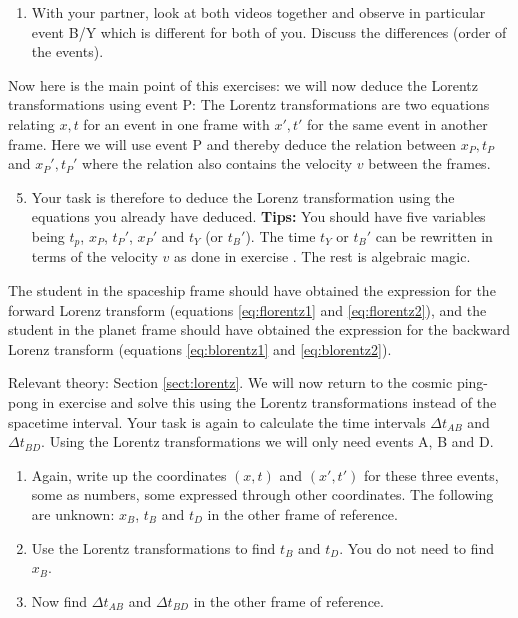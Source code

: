 {\begin{multicols}{2}
\begin{enumerate}
\begin{enumerate}
\item Now use the time $t_P'$ to obtain a number for the position $x_P'$ of event P in the spaceship frame.
\end{enumerate}
\item With your partner, look at both videos together and observe in particular event B/Y which is different for both of you. Discuss the differences (order of the events).
\end{enumerate}
Now here is the main point of this exercises: we will now deduce the Lorentz transformations using event P: The Lorentz transformations are two equations relating $x,t$ for an event in one frame with $x',t'$ for the same event in another frame. Here we will use event P and thereby deduce the relation between $x_P,t_P$ and $x_P',t_P'$ where the relation also contains the velocity $v$ between the frames.
\begin{enumerate}
\setcounter{enumi}{4}
\item Your task is therefore to deduce the Lorenz transformation using the equations you already have deduced.
{\bf Tips:}
You should have five variables being $t_p$, $x_P$, $t_P'$, $x_P'$ and $t_{Y}$ (or $t_{B}'$). The time $t_Y$ or $t_B'$ can be rewritten in terms of the velocity $v$ as done in exercise . The rest is algebraic magic.
\end{enumerate}

The student in the spaceship frame should have obtained the expression for the forward Lorenz transform (equations \ref{eq:florentz1} and \ref{eq:florentz2}), and the student in the planet frame should have obtained the expression for the backward Lorenz transform  (equations \ref{eq:blorentz1} and \ref{eq:blorentz2}).

\vspace{0.5cm}


Relevant theory: Section \ref{sect:lorentz}.\newline
We will now return to the cosmic ping-pong in exercise  and solve this using the Lorentz transformations instead of the spacetime interval. Your task is again to calculate the time intervals $\Delta t_{AB}$ and $\Delta t_{BD}$. Using the Lorentz transformations we will only need events A, B and D.

\begin{enumerate}
\item Again, write up the coordinates $(x,t)$ and $(x',t')$ for these three events, some as numbers, some expressed through other coordinates. The following are unknown: $x_B$, $t_B$ and $t_D$ in the other frame of reference.
\item Use the Lorentz transformations to find $t_B$ and $t_D$. You do not need to find $x_B$.
\item Now find  $\Delta t_{AB}$ and $\Delta t_{BD}$ in the other frame of reference.
\end{enumerate}


\end{multicols}}
